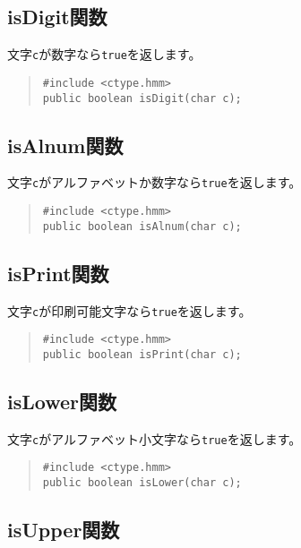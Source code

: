 \subsection{isDigit関数}

文字\verb/c/が数字なら\verb/true/を返します。

\begin{quote}
\begin{verbatim}
#include <ctype.hmm>
public boolean isDigit(char c);
\end{verbatim}
\end{quote}

\subsection{isAlnum関数}

文字\verb/c/がアルファベットか数字なら\verb/true/を返します。

\begin{quote}
\begin{verbatim}
#include <ctype.hmm>
public boolean isAlnum(char c);
\end{verbatim}
\end{quote}

\subsection{isPrint関数}

文字\verb/c/が印刷可能文字なら\verb/true/を返します。

\begin{quote}
\begin{verbatim}
#include <ctype.hmm>
public boolean isPrint(char c);
\end{verbatim}
\end{quote}

\subsection{isLower関数}

文字\verb/c/がアルファベット小文字なら\verb/true/を返します。

\begin{quote}
\begin{verbatim}
#include <ctype.hmm>
public boolean isLower(char c);
\end{verbatim}
\end{quote}

\subsection{isUpper関数}

